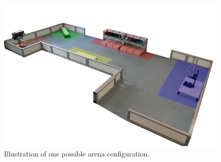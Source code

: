 \begin{figure}
\includegraphics[width= \textwidth ]{../images/arena_brsu_spatial_areas.jpg}
\caption{Illustration of one possible arena configuration. }
\label{fig:example_map_go13}
\end{figure}
